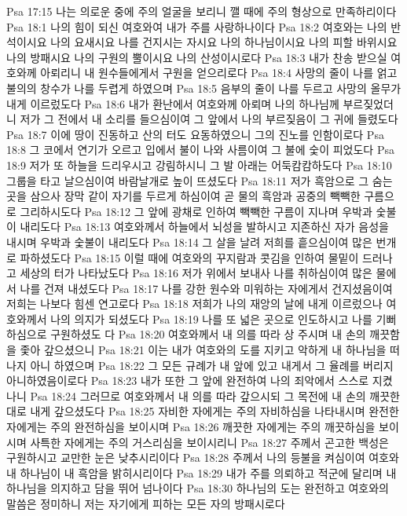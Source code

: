 Psa 17:15  나는 의로운 중에 주의 얼굴을 보리니 깰 때에 주의 형상으로 만족하리이다
Psa 18:1  나의 힘이 되신 여호와여 내가 주를 사랑하나이다
Psa 18:2  여호와는 나의 반석이시요 나의 요새시요 나를 건지시는 자시요 나의 하나님이시요 나의 피할 바위시요 나의 방패시요 나의 구원의 뿔이시요 나의 산성이시로다
Psa 18:3  내가 찬송 받으실 여호와께 아뢰리니 내 원수들에게서 구원을 얻으리로다
Psa 18:4  사망의 줄이 나를 얽고 불의의 창수가 나를 두렵게 하였으며
Psa 18:5  음부의 줄이 나를 두르고 사망의 올무가 내게 이르렀도다
Psa 18:6  내가 환난에서 여호와께 아뢰며 나의 하나님께 부르짖었더니 저가 그 전에서 내 소리를 들으심이여 그 앞에서 나의 부르짖음이 그 귀에 들렸도다
Psa 18:7  이에 땅이 진동하고 산의 터도 요동하였으니 그의 진노를 인함이로다
Psa 18:8  그 코에서 연기가 오르고 입에서 불이 나와 사름이여 그 불에 숯이 피었도다
Psa 18:9  저가 또 하늘을 드리우시고 강림하시니 그 발 아래는 어둑캄캄하도다
Psa 18:10  그룹을 타고 날으심이여 바람날개로 높이 뜨셨도다
Psa 18:11  저가 흑암으로 그 숨는 곳을 삼으사 장막 같이 자기를 두르게 하심이여 곧 물의 흑암과 공중의 빽빽한 구름으로 그리하시도다
Psa 18:12  그 앞에 광채로 인하여 빽빽한 구름이 지나며 우박과 숯불이 내리도다
Psa 18:13  여호와께서 하늘에서 뇌성을 발하시고 지존하신 자가 음성을 내시며 우박과 숯불이 내리도다
Psa 18:14  그 살을 날려 저희를 흩으심이여 많은 번개로 파하셨도다
Psa 18:15  이럴 때에 여호와의 꾸지람과 콧김을 인하여 물밑이 드러나고 세상의 터가 나타났도다
Psa 18:16  저가 위에서 보내사 나를 취하심이여 많은 물에서 나를 건져 내셨도다
Psa 18:17  나를 강한 원수와 미워하는 자에게서 건지셨음이여 저희는 나보다 힘센 연고로다
Psa 18:18  저희가 나의 재앙의 날에 내게 이르렀으나 여호와께서 나의 의지가 되셨도다
Psa 18:19  나를 또 넓은 곳으로 인도하시고 나를 기뻐하심으로 구원하셨도 다
Psa 18:20  여호와께서 내 의를 따라 상 주시며 내 손의 깨끗함을 좇아 갚으셨으니
Psa 18:21  이는 내가 여호와의 도를 지키고 악하게 내 하나님을 떠나지 아니 하였으며
Psa 18:22  그 모든 규례가 내 앞에 있고 내게서 그 율례를 버리지 아니하였음이로다
Psa 18:23  내가 또한 그 앞에 완전하여 나의 죄악에서 스스로 지켰나니
Psa 18:24  그러므로 여호와께서 내 의를 따라 갚으시되 그 목전에 내 손의 깨끗한대로 내게 갚으셨도다
Psa 18:25  자비한 자에게는 주의 자비하심을 나타내시며 완전한 자에게는 주의 완전하심을 보이시며
Psa 18:26  깨끗한 자에게는 주의 깨끗하심을 보이시며 사특한 자에게는 주의 거스리심을 보이시리니
Psa 18:27  주께서 곤고한 백성은 구원하시고 교만한 눈은 낮추시리이다
Psa 18:28  주께서 나의 등불을 켜심이여 여호와 내 하나님이 내 흑암을 밝히시리이다
Psa 18:29  내가 주를 의뢰하고 적군에 달리며 내 하나님을 의지하고 담을 뛰어 넘나이다
Psa 18:30  하나님의 도는 완전하고 여호와의 말씀은 정미하니 저는 자기에게 피하는 모든 자의 방패시로다

